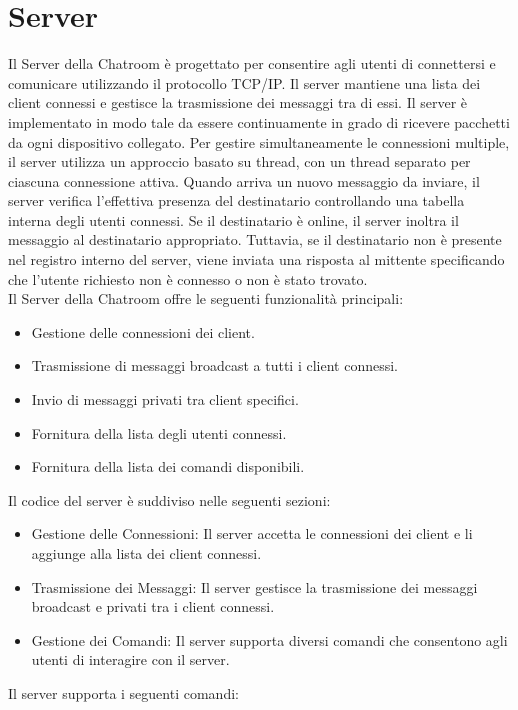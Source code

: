 \documentclass[a4paper,12pt]{report}
\begin{document}
\chapter{Server}
Il Server della Chatroom è progettato per consentire agli utenti di connettersi e comunicare utilizzando il protocollo TCP/IP. Il server mantiene una lista dei client connessi e gestisce la trasmissione dei messaggi tra di essi.
Il server è implementato in modo tale da essere continuamente in grado di ricevere pacchetti da ogni dispositivo collegato. Per gestire simultaneamente le connessioni multiple, il server utilizza un approccio basato su thread, con un thread separato per ciascuna connessione attiva.
Quando arriva un nuovo messaggio da inviare, il server verifica l'effettiva presenza del destinatario controllando una tabella interna degli utenti connessi. Se il destinatario è online, il server inoltra il messaggio al destinatario appropriato. Tuttavia, se il destinatario non è presente nel registro interno del server, viene inviata una risposta al mittente specificando che l'utente richiesto non è connesso o non è stato trovato.
\\
Il Server della Chatroom offre le seguenti funzionalità principali:
\begin{itemize}
	\item Gestione delle connessioni dei client.
	\item Trasmissione di messaggi broadcast a tutti i client connessi.
	\item Invio di messaggi privati tra client specifici.
	\item Fornitura della lista degli utenti connessi.
	\item Fornitura della lista dei comandi disponibili.
\end{itemize}
Il codice del server è suddiviso nelle seguenti sezioni:
\begin{itemize}
	\item Gestione delle Connessioni: Il server accetta le connessioni dei client e li aggiunge alla lista dei client connessi.
	\item Trasmissione dei Messaggi: Il server gestisce la trasmissione dei messaggi broadcast e privati tra i client connessi.
	\item Gestione dei Comandi: Il server supporta diversi comandi che consentono agli utenti di interagire con il server.
\end{itemize}
Il server supporta i seguenti comandi:
\end{document}
